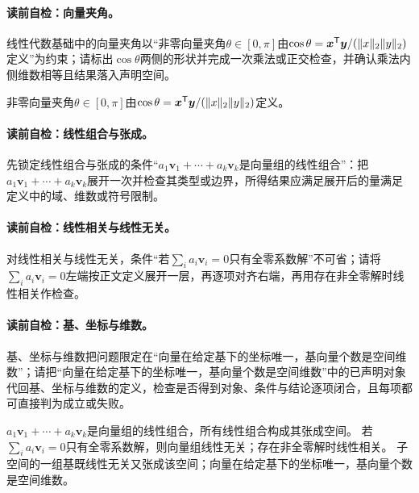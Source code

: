 \paragraph{读前自检：向量夹角。}线性代数基础中的向量夹角以“非零向量夹角$\theta\in[0,\pi]$由$\cos\theta=\boldsymbol{x}^{\mathsf T}\boldsymbol{y}/(\lVert x\rVert_2\lVert y\rVert_2)$定义”为约束；请标出$\cos\theta$两侧的形状并完成一次乘法或正交检查，并确认乘法内侧维数相等且结果落入声明空间。\par

非零向量夹角$\theta\in[0,\pi]$由$\cos\theta=\boldsymbol{x}^{\mathsf T}\boldsymbol{y}/(\lVert x\rVert_2\lVert y\rVert_2)$定义。


\paragraph{读前自检：线性组合与张成。}先锁定线性组合与张成的条件“$a_1\boldsymbol{v}_1+\cdots+a_k\boldsymbol{v}_k$是向量组的线性组合”：把$a_1\boldsymbol{v}_1+\cdots+a_k\boldsymbol{v}_k$展开一次并检查其类型或边界，所得结果应满足展开后的量满足定义中的域、维数或符号限制。\par
\paragraph{读前自检：线性相关与线性无关。}对线性相关与线性无关，条件“若$\sum_i a_i\boldsymbol{v}_i=0$只有全零系数解”不可省；请将$\sum_i a_i\boldsymbol{v}_i=0$左端按正文定义展开一层，再逐项对齐右端，再用存在非全零解时线性相关作检查。\par
\paragraph{读前自检：基、坐标与维数。}基、坐标与维数把问题限定在“向量在给定基下的坐标唯一，基向量个数是空间维数”；请把“向量在给定基下的坐标唯一，基向量个数是空间维数”中的已声明对象代回基、坐标与维数的定义，检查是否得到对象、条件与结论逐项闭合，且每项都可直接判为成立或失败。\par

$a_1\boldsymbol{v}_1+\cdots+a_k\boldsymbol{v}_k$是向量组的线性组合，所有线性组合构成其张成空间。
若$\sum_i a_i\boldsymbol{v}_i=0$只有全零系数解，则向量组线性无关；存在非全零解时线性相关。
子空间的一组基既线性无关又张成该空间；向量在给定基下的坐标唯一，基向量个数是空间维数。


